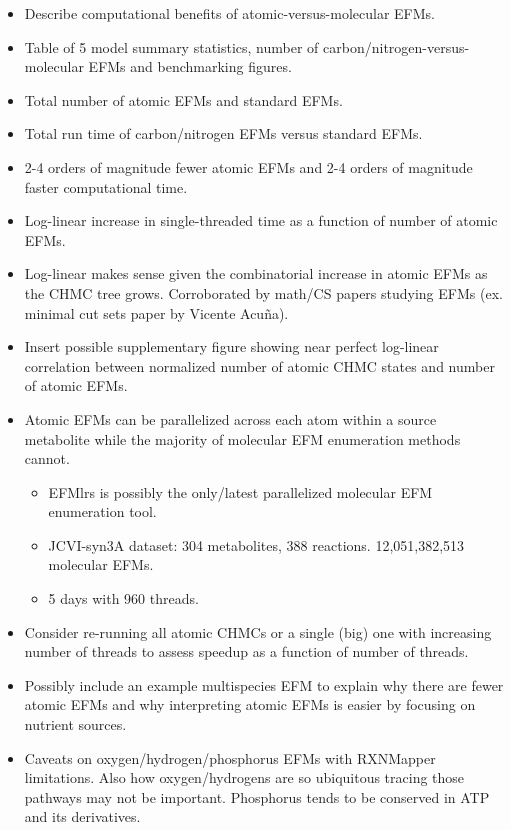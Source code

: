 \documentclass[11pt]{article}
\begin{document}
\begin{itemize}
    \item Describe computational benefits of atomic-versus-molecular EFMs.
    \item Table of 5 model summary statistics, number of carbon/nitrogen-versus-molecular EFMs and benchmarking figures.
    \item Total number of atomic EFMs and standard EFMs.
    \item Total run time of carbon/nitrogen EFMs versus standard EFMs.
    \item 2-4 orders of magnitude fewer atomic EFMs and 2-4 orders of magnitude faster computational time.
    \item Log-linear increase in single-threaded time as a function of number of atomic EFMs.
    \item Log-linear makes sense given the combinatorial increase in atomic EFMs as the CHMC tree grows. Corroborated by math/CS papers studying EFMs  (ex. minimal cut sets paper by Vicente Acuña).
    \item Insert possible supplementary figure showing near perfect log-linear correlation between normalized number of atomic CHMC states and number of atomic EFMs.
    \item Atomic EFMs can be parallelized across each atom within a source metabolite while the majority of molecular EFM enumeration methods cannot.
    \begin{itemize}
        \item EFMlrs is possibly the only/latest parallelized molecular EFM enumeration tool.
        \item JCVI-syn3A dataset: 304 metabolites, 388 reactions. 12,051,382,513 molecular EFMs.
        \item 5 days with 960 threads.
    \end{itemize}
    \item Consider re-running all atomic CHMCs or a single (big) one with increasing number of threads to assess speedup as a function of number of threads.
    \item Possibly include an example multispecies EFM to explain why there are fewer atomic EFMs and why interpreting atomic EFMs is easier by focusing on nutrient sources.
    \item Caveats on oxygen/hydrogen/phosphorus EFMs with RXNMapper limitations. Also how oxygen/hydrogens are so ubiquitous tracing those pathways may not be important. Phosphorus tends to be conserved in ATP and its derivatives.
\end{itemize}
\end{document}
